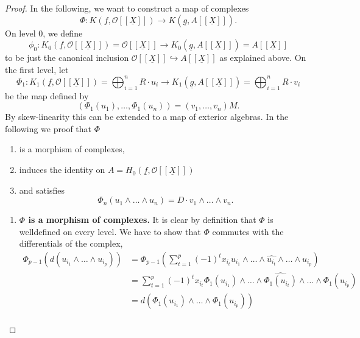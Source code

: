 \documentclass{article}
\theoremstyle{plain}%
\theoremstyle{definition}
\theoremstyle{remark}
\begin{document}
\begin{proof}
    In the following, we want to construct a map of complexes
    \[\Phi\colon K(\underline{f}, \mathcal{O}[[\underline{X}]]) \to K(\underline{g}, A[[\underline{X}]]).\]
    On level 0, we define 
    \[
        \phi_0 \colon K_0(\underline{f}, \mathcal{O}[[\underline{X}]]) = \mathcal{O}[[\underline{X}]] 
        \to 
        K_0(\underline{g}, A[[\underline{X}]]) = A[[\underline{X}]]
    \]
    to be just the canonical inclusion \(\mathcal{O}[[\underline{X}]] \hookrightarrow A[[\underline{X}]]\)
    as explained above.
    On the first level, let
    \[
        \Phi_1 \colon 
            K_1(\underline{f}, \mathcal{O}[[\underline{X}]]) = \bigoplus_{i = 1}^n R \cdot u_i
            \to 
            K_1(\underline{g}, A[[\underline{X}]]) = \bigoplus_{i=1}^n R \cdot v_i
    \]
    be the map defined by
    \[
        (\Phi_1(u_1), \dots, \Phi_1(u_n)) = (v_1, \dots, v_n)M. %
    \]
    By skew-linearity this can be extended to a map of exterior algebras. %
    In the following we proof that \(\Phi\)
    \begin{enumerate}
        \item is a morphism of complexes,
        \item induces the identity on \(A = H_0(\underline{f}, \mathcal{O}[[\underline{X}]])\)
        \item and satisfies
        \[
            \Phi_n(u_1 \wedge \dots \wedge u_n) = D \cdot v_1 \wedge \dots \wedge v_n.  
        \]
    \end{enumerate}
    \begin{enumerate}
        \item \textbf{\(\Phi\) is a morphism of complexes.}
        It is clear by definition that \(\Phi\) is welldefined on every level.
        We have to show that \(\Phi\) commutes with the differentials of the complex,
        \begin{align*}
            \Phi_{p-1}(d(u_{i_1}\!\wedge\!\dots\!\wedge\!u_{i_p})) 
            &= \Phi_{p-1}\left(\sum_{t=1}^p(-1)^t x_{i_t} 
            u_{i_1}\!\wedge\!\dots\!\wedge\!\widehat{u_{i_t}}\!\wedge\!\dots\!\wedge\!u_{i_p}\right)\\
            &= \sum_{t=1}^p(-1)^t x_{i_t}\Phi_1(u_{i_1})\!\wedge\!\dots\!
            \wedge\widehat{\Phi_1(u_{i_t})}\!\wedge\!\dots\!\wedge\!\Phi_1(u_{i_p})\\
            &= d(\Phi_1(u_{i_1})\wedge\dots\wedge \Phi_1(u_{i_p}))\\

\end{align*}
\end{enumerate}
\end{proof}
\end{document}
